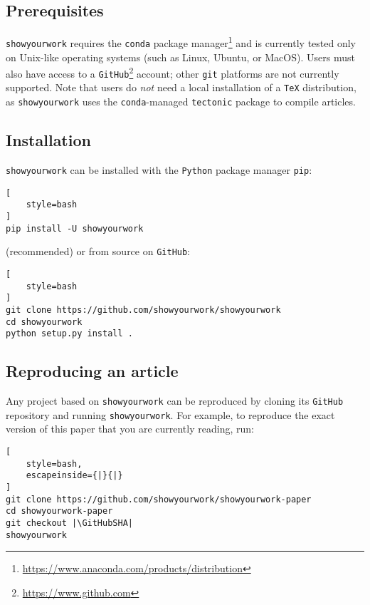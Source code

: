 \documentclass{aastex631}
\newcommand\syw{\texttt{showyourwork}\xspace}
\begin{document}
\subsection{Prerequisites}
\label{sec:usage:prereq}
\syw requires the \texttt{conda} package manager\footnote{\url{https://www.anaconda.com/products/distribution}} and is currently tested only on Unix-like operating systems (such as Linux, Ubuntu, or MacOS).
Users must also have access to a \texttt{GitHub}\footnote{\url{https://www.github.com}} account; other \texttt{git} platforms are not currently supported.
Note that users do \emph{not} need a local installation of a \texttt{TeX} distribution, as \syw uses the \texttt{conda}-managed \texttt{tectonic} package to compile articles.

\subsection{Installation}
\label{sec:usage:install}
\syw can be installed with the \texttt{Python} package manager \texttt{pip}:\\

\noindent\begin{minipage}{\linewidth}
\begin{lstlisting}[
    style=bash
]
pip install -U showyourwork
\end{lstlisting}
\end{minipage}

\noindent (recommended) or from source on \texttt{GitHub}:\\

\noindent\begin{minipage}{\linewidth}
\begin{lstlisting}[
    style=bash
]
git clone https://github.com/showyourwork/showyourwork
cd showyourwork
python setup.py install .
\end{lstlisting}
\end{minipage}

\subsection{Reproducing an article}
\label{sec:usage:reproduce}
Any project based on \syw can be reproduced by cloning its \texttt{GitHub} repository and running \syw. For example, to reproduce the exact version of this paper that you are currently reading, run:\\

\noindent\begin{minipage}{\linewidth}
\begin{lstlisting}[
    style=bash,
    escapeinside={|}{|}
]
git clone https://github.com/showyourwork/showyourwork-paper
cd showyourwork-paper
git checkout |\GitHubSHA|
showyourwork
\end{lstlisting}
\end{minipage}
\end{document}
